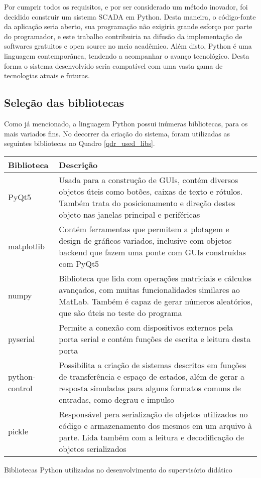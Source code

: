Por cumprir todos os requisitos, e por ser considerado um método inovador, foi decidido construir um sistema SCADA em Python. Desta maneira, o código-fonte da aplicação seria aberto, sua programação não exigiria grande esforço por parte do programador, e este trabalho contribuiria na difusão da implementação de softwares gratuitos e open source no meio acadêmico. Além disto, Python é uma linguagem contemporânea, tendendo a acompanhar o avanço tecnológico. Desta forma o sistema desenvolvido seria compatível com uma vasta gama de tecnologias atuais e futuras.

\subsection{Seleção das bibliotecas}

Como já mencionado, a linguagem Python possui inúmeras bibliotecas, para os mais variados fins. No decorrer da criação do sistema, foram utilizadas as seguintes bibliotecas no Quadro \ref{qdr_used_libs}.

\begin{quadro}
	\centering
	\begin{tabular}{|m{5em}|m{25em}|}
		\hline
		Biblioteca & Descrição \\
		\hline
		PyQt5 & Usada para a construção de GUIs, contém diversos objetos úteis como botões, caixas de texto e rótulos. Também trata do posicionamento e direção destes objeto nas janelas principal e periféricas \\
		\hline
		matplotlib & Contém ferramentas que permitem a plotagem e design de gráficos variados, inclusive com objetos backend que fazem uma ponte com GUIs construídas com PyQt5 \\
		\hline
		numpy & Biblioteca que lida com operações matriciais e cálculos avançados, com muitas funcionalidades similares ao MatLab. Também é capaz de gerar números aleatórios, que são úteis no teste do programa \\
		\hline
		pyserial & Permite a conexão com dispositivos externos pela porta serial e contém funções de escrita e leitura desta porta \\
		\hline
		python-control & Possibilita a criação de sistemas descritos em funções de transferência e espaço de estados, além de gerar a resposta simuladas para alguns formatos comuns de entradas, como degrau e impulso \\
		\hline
		pickle & Responsável pera serialização de objetos utilizados no código e armazenamento dos mesmos em um arquivo à parte. Lida também com a leitura e decodificação de objetos serializados \\
		\hline
	\end{tabular}
	\caption{Bibliotecas Python utilizadas no desenvolvimento do supervisório didático}
	\label{qdr_used_libs}
\end{quadro}

